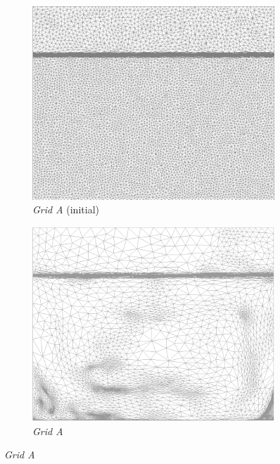 \begin{figure}[H]
\centering
  \begin{subfigure}[t]{0.3\textwidth}
    \centering
    \includegraphics[width=\textwidth]{Chapter5/Graphics/2d/GridAinit.png}
    \caption{\emph{Grid A} (initial)}
    \label{fig:gridAinit}
  \end{subfigure}
  \begin{subfigure}[t]{0.3\textwidth}
    \centering
    \includegraphics[width=\textwidth]{Chapter5/Graphics/2d/GridA.png}
    \caption{\emph{Grid A}}

\end{subfigure}
\end{figure}
